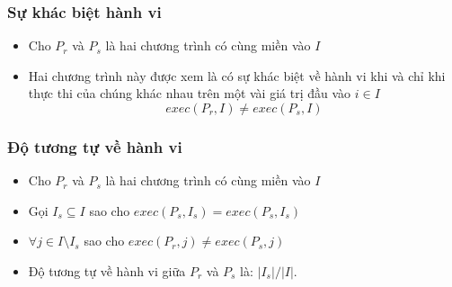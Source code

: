 \documentclass{beamer}
\begin{document}
\begin{frame}
  \frametitle{Sự khác biệt hành vi}
  \begin{block}{}
  \begin{itemize}
  	\item Cho $P_r$ và $P_s$ là hai chương trình có cùng miền vào $I$ 
  	\item Hai chương trình này được xem là có sự khác biệt về
  	hành vi khi và chỉ khi thực thi của chúng khác nhau trên một vài giá
  	trị đầu vào $i \in I$
  	\[exec(P_r, I) \neq exec(P_s, I)\]
  \end{itemize}
  \end{block}
\end{frame}


\begin{frame}
  \frametitle{Độ tương tự về hành vi}
  \begin{block}{}
  	\begin{itemize}
  		\item Cho $P_r$ và $P_s$ là hai chương trình có cùng miền
  		vào $I$
  		\item Gọi $I_{s} \subseteq I$ sao cho $exec(P_s, I_{s}) = exec(P_s, I_{s})$ 
  		\item $\forall j \in I \setminus I_{s}$ sao cho $exec(P_r, j) \neq exec(P_s,
  		j)$
  		\item Độ tương tự về hành vi giữa $P_r$ và $P_s$ là: $|I_s|/|I|$.
  	\end{itemize}
  \end{block}
  
\end{frame}
\end{document}
